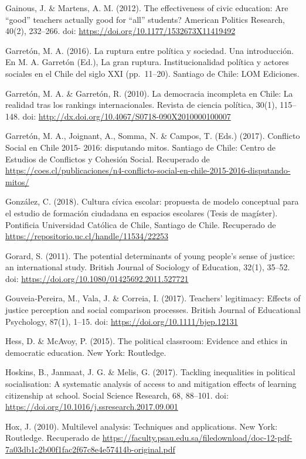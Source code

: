 \documentclass[12pt,twoside]{templates/facsothesis}
\begin{document}
Gainous, J. \& Martens, A. M. (2012). The effectiveness of civic education: Are ``good'' teachers actually good for ``all'' students? American Politics Research, 40(2), 232--266. doi: \url{https://doi.org/10.1177/1532673X11419492}

Garretón, M. A. (2016). La ruptura entre política y sociedad. Una introducción. En M. A. Garretón (Ed.), La gran ruptura. Institucionalidad política y actores sociales en el Chile del siglo XXI (pp.~11--20). Santiago de Chile: LOM Ediciones.

Garretón, M. A. \& Garretón, R. (2010). La democracia incompleta en Chile: La realidad tras los rankings internacionales. Revista de ciencia política, 30(1), 115--148. doi: \url{http://dx.doi.org/10.4067/S0718-090X2010000100007}

Garretón, M. A., Joignant, A., Somma, N. \& Campos, T. (Eds.) (2017). Conflicto Social en Chile 2015- 2016: disputando mitos. Santiago de Chile: Centro de Estudios de Conflictos y Cohesión Social. Recuperado de \url{https://coes.cl/publicaciones/n4-conflicto-social-en-chile-2015-2016-disputando-mitos/}

González, C. (2018). Cultura cívica escolar: propuesta de modelo conceptual para el estudio de formación ciudadana en espacios escolares (Tesis de magíster). Pontificia Universidad Católica de Chile, Santiago de Chile. Recuperado de \url{https://repositorio.uc.cl/handle/11534/22253}

Gorard, S. (2011). The potential determinants of young people's sense of justice: an international study. British Journal of Sociology of Education, 32(1), 35--52. doi: \url{https://doi.org/10.1080/01425692.2011.527721}

Gouveia‐Pereira, M., Vala, J. \& Correia, I. (2017). Teachers' legitimacy: Effects of justice perception and social comparison processes. British Journal of Educational Psychology, 87(1), 1--15. doi: \url{https://doi.org/10.1111/bjep.12131}

Hess, D. \& McAvoy, P. (2015). The political classroom: Evidence and ethics in democratic education. New York: Routledge.

Hoskins, B., Janmaat, J. G. \& Melis, G. (2017). Tackling inequalities in political socialisation: A systematic analysis of access to and mitigation effects of learning citizenship at school. Social Science Research, 68, 88--101. doi: \url{https://doi.org/10.1016/j.ssresearch.2017.09.001}

Hox, J. (2010). Multilevel analysis: Techniques and applications. New York: Routledge. Recuperado de \url{https://faculty.psau.edu.sa/filedownload/doc-12-pdf-7a03db1c2b00f1fac2f67c8e4e57414b-original.pdf}
\end{document}
